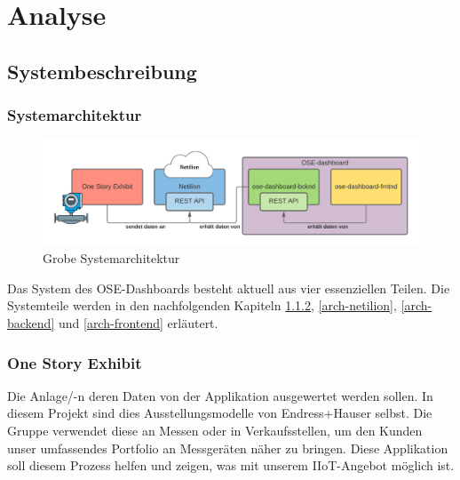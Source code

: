 
\chapter{Analyse}
\section{Systembeschreibung}
\subsection{Systemarchitektur}
\begin{figure}[!ht]
  \centering
  \includegraphics[width=1\linewidth]{./images/system.png}
  \caption[Eine von mir mit Lucidchart erstellte grobe Systemarchitektur]{Grobe Systemarchitektur}
  \label{fig:systemarchitektur}
\end{figure}
Das System des OSE-Dashboards besteht aktuell aus vier essenziellen Teilen. Die Systemteile werden in den nachfolgenden Kapiteln \ref{arch-ose}, \ref{arch-netilion}, \ref{arch-backend} und \ref{arch-frontend} erläutert.
\subsection{One Story Exhibit} \label{arch-ose}
Die Anlage/-n deren Daten von der Applikation ausgewertet werden sollen. In diesem Projekt sind dies Ausstellungsmodelle von Endress+Hauser selbst. Die Gruppe verwendet diese an Messen oder in Verkaufsstellen, um den Kunden unser umfassendes Portfolio an Messgeräten näher zu bringen. Diese Applikation soll diesem Prozess helfen und zeigen, was mit unserem IIoT-Angebot möglich ist.
